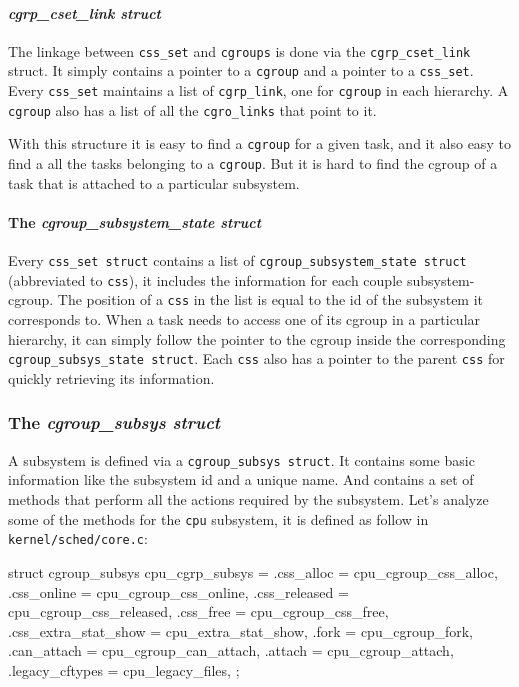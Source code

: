 \paragraph{\textit{cgrp\_cset\_link struct}}
The linkage between \verb|css_set| and \verb|cgroups| is done via the \verb|cgrp_cset_link| struct. It simply contains a pointer to a \verb|cgroup| and a pointer to a \verb|css_set|. Every \verb|css_set| maintains a list of \verb|cgrp_link|, one for \verb|cgroup| in each hierarchy. A \verb|cgroup| also has a list of all the \verb|cgro_links| that point to it. 

With this structure it is easy to find a \verb|cgroup| for a given task, and it also easy to find a all the tasks belonging to a \verb|cgroup|. But it is hard to find the cgroup of a task that is attached to a particular subsystem.

\paragraph{The \textit{cgroup\_subsystem\_state struct}}
Every \verb|css_set struct| contains a list of \verb|cgroup_subsystem_state struct| (abbreviated to \verb|css|), it includes the information for each couple subsystem-cgroup.
The position of a \verb|css| in the list is equal to the id of the subsystem it corresponds to. When a task needs to access one of its cgroup in a particular hierarchy, it can simply follow the pointer to the cgroup inside the corresponding \verb|cgroup_subsys_state struct|. Each \verb|css| also has a pointer to the parent \verb|css| for quickly retrieving its information.

\subsubsection{The \textit{cgroup\_subsys struct}}
A subsystem is defined via a \verb|cgroup_subsys struct|. It contains some basic information like the subsystem id and a unique name. And contains a set of methods that perform all the actions required by the subsystem. Let's analyze some of the methods for the \verb|cpu| subsystem, it is defined as follow in \verb|kernel/sched/core.c|:
\begin{code}
struct cgroup_subsys cpu_cgrp_subsys = {
	.css_alloc	= cpu_cgroup_css_alloc,
	.css_online	= cpu_cgroup_css_online,
	.css_released	= cpu_cgroup_css_released,
	.css_free	= cpu_cgroup_css_free,
	.css_extra_stat_show = cpu_extra_stat_show,
	.fork		= cpu_cgroup_fork,
	.can_attach	= cpu_cgroup_can_attach,
	.attach		= cpu_cgroup_attach,
	.legacy_cftypes	= cpu_legacy_files,
};
\end{code}
